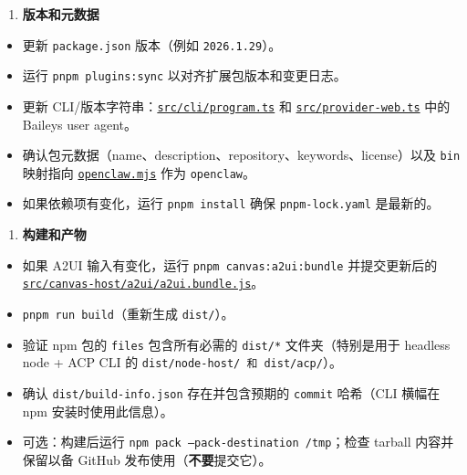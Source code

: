 \begin{enumerate}
  \item \textbf{版本和元数据}
\end{enumerate}


\begin{itemize}
  \item [ ] 更新 \texttt{package.json} 版本（例如 \texttt{2026.1.29}）。
  \item [ ] 运行 \texttt{pnpm plugins:sync} 以对齐扩展包版本和变更日志。
  \item [ ] 更新 CLI/版本字符串：\href{https://github.com/openclaw/openclaw/blob/main/src/cli/program.ts}{\texttt{src/cli/program.ts}} 和 \href{https://github.com/openclaw/openclaw/blob/main/src/provider-web.ts}{\texttt{src/provider-web.ts}} 中的 Baileys user agent。
  \item [ ] 确认包元数据（name、description、repository、keywords、license）以及 \texttt{bin} 映射指向 \href{https://github.com/openclaw/openclaw/blob/main/openclaw.mjs}{\texttt{openclaw.mjs}} 作为 \texttt{openclaw}。
  \item [ ] 如果依赖项有变化，运行 \texttt{pnpm install} 确保 \texttt{pnpm-lock.yaml} 是最新的。
\end{itemize}


\begin{enumerate}
  \item \textbf{构建和产物}
\end{enumerate}


\begin{itemize}
  \item [ ] 如果 A2UI 输入有变化，运行 \texttt{pnpm canvas:a2ui:bundle} 并提交更新后的 \href{https://github.com/openclaw/openclaw/blob/main/src/canvas-host/a2ui/a2ui.bundle.js}{\texttt{src/canvas-host/a2ui/a2ui.bundle.js}}。
  \item [ ] \texttt{pnpm run build}（重新生成 \texttt{dist/}）。
  \item [ ] 验证 npm 包的 \texttt{files} 包含所有必需的 \texttt{dist/*} 文件夹（特别是用于 headless node + ACP CLI 的 \texttt{dist/node-host/\textbf{} 和 \texttt{dist/acp/}}）。
  \item [ ] 确认 \texttt{dist/build-info.json} 存在并包含预期的 \texttt{commit} 哈希（CLI 横幅在 npm 安装时使用此信息）。
  \item [ ] 可选：构建后运行 \texttt{npm pack --pack-destination /tmp}；检查 tarball 内容并保留以备 GitHub 发布使用（\textbf{不要}提交它）。
\end{itemize}


